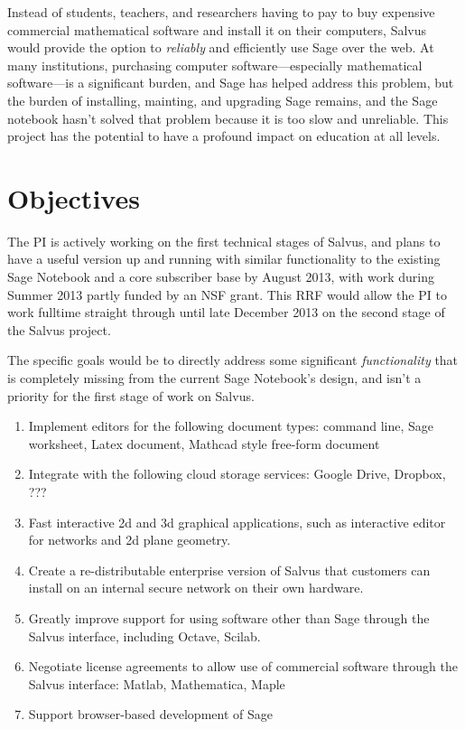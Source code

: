 \documentclass[11pt]{article}
\begin{document}
Instead of students, teachers, and researchers having to pay to buy
expensive commercial mathematical software and install it on their
computers, Salvus would provide the option to {\em reliably} and
efficiently use Sage over the web.  At many institutions, purchasing
computer software---especially mathematical software---is a
significant burden, and Sage has helped address this problem, but the
burden of installing, mainting, and upgrading Sage remains, and the
Sage notebook hasn't solved that problem because it is too slow and
unreliable.     This project has the potential to have a profound impact
on education at all levels. 

\section{Objectives}

The PI is actively working on the first technical stages of Salvus,
and plans to have a useful version up and running with similar
functionality to the existing Sage Notebook and a core subscriber base
by August 2013, with work during Summer 2013 partly funded by an NSF
grant.  This RRF would allow the PI to work fulltime straight through
until late December 2013 on the second stage of the Salvus project.

The specific goals would be to directly address some significant {\em
  functionality} that is completely missing from the current Sage
Notebook's design, and isn't a priority for the first stage of work on
Salvus.

\begin{enumerate}
\item Implement editors for the following document types: command
  line, Sage worksheet, Latex document, Mathcad style free-form
  document
\item Integrate with the following cloud storage services: Google
  Drive, Dropbox, ???
\item Fast interactive 2d and 3d graphical applications, such as
  interactive editor for networks and 2d plane geometry.
\item Create a re-distributable enterprise version of Salvus that
  customers can install on an internal secure network on their own
  hardware.
\item Greatly improve support for using software other than Sage
  through the Salvus interface, including Octave, Scilab.
\item Negotiate license agreements to allow use of commercial software
  through the Salvus interface: Matlab, Mathematica, Maple
\item Support browser-based development of Sage
\end{enumerate}
\end{document}
